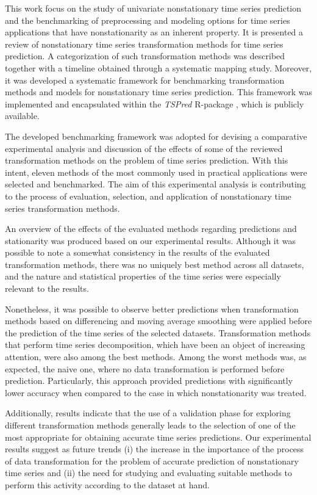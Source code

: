 \documentclass[11pt]{dippg}
\begin{document}
This work focus on the study of univariate nonstationary time series prediction and the benchmarking of preprocessing and modeling options for time series applications that have nonstationarity as an inherent property.
It is presented a review of nonstationary time series transformation methods for time series prediction. A categorization of such transformation methods was described together with a timeline obtained through a systematic mapping study. Moreover, it was developed a systematic framework for benchmarking transformation methods and models for nonstationary time series prediction. This framework was implemented and encapsulated within the \emph{TSPred} R-package \cite{salles_tspred:_2018}, which is publicly available.

The developed benchmarking framework was adopted for devising a comparative experimental analysis and discussion of the effects of some of the reviewed transformation methods on the problem of time series prediction. With this intent, eleven methods of the most commonly used in practical applications were selected and benchmarked. The aim of this experimental analysis is contributing to the process of evaluation, selection, and application of nonstationary time series transformation methods.

An overview of the effects of the evaluated methods regarding predictions and stationarity was produced based on our experimental results. Although it was possible to note a somewhat consistency in the results of the evaluated transformation methods, there was no uniquely best method across all datasets, and the nature and statistical properties of the time series were especially relevant to the results.

Nonetheless, it was possible to observe better predictions when transformation methods based on differencing and moving average smoothing were applied before the prediction of the time series of the selected datasets. Transformation methods that perform time series decomposition, which have been an object of increasing attention, were also among the best methods. Among the worst methods was, as expected, the naive one, where no data transformation is performed before prediction. Particularly, this approach provided predictions with significantly lower accuracy when compared to the case in which nonstationarity was treated.

Additionally, results indicate that the use of a validation phase for exploring different transformation methods generally leads to the selection of one of the most appropriate for obtaining accurate time series predictions. Our experimental results suggest as future trends (i) the increase in the importance of the process of data transformation for the problem of accurate prediction of nonstationary time series and (ii) the need for studying and evaluating suitable methods to perform this activity according to the dataset at hand.
\end{document}
